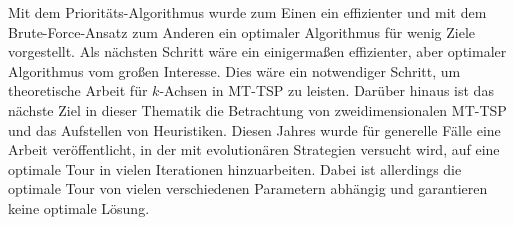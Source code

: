 \documentclass[german,version-2019-11]{uzl-thesis}
\begin{document}
Mit dem Prioritäts-Algorithmus wurde zum Einen ein effizienter und mit dem Brute-Force-Ansatz zum Anderen ein optimaler Algorithmus für wenig Ziele vorgestellt. Als nächsten Schritt wäre ein einigermaßen effizienter, aber optimaler Algorithmus vom großen Interesse. Dies wäre ein notwendiger Schritt, um theoretische Arbeit für $k$-Achsen in MT-TSP zu leisten. Darüber hinaus ist das nächste Ziel in dieser Thematik die Betrachtung von zweidimensionalen MT-TSP und das Aufstellen von Heuristiken.
Diesen Jahres wurde für generelle Fälle eine Arbeit \cite{moraes} veröffentlicht, in der mit evolutionären Strategien versucht wird, auf eine optimale Tour in vielen Iterationen hinzuarbeiten. Dabei ist allerdings die optimale Tour von vielen verschiedenen Parametern abhängig und garantieren keine optimale Lösung. 
\end{document}
